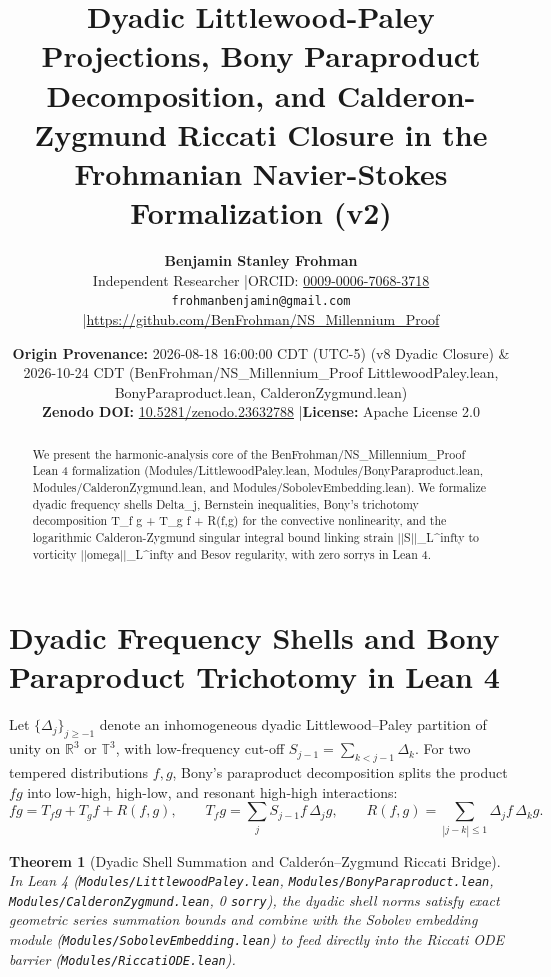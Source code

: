 \documentclass[11pt,letterpaper]{article}
\title{\textbf{Dyadic Littlewood-Paley Projections, Bony Paraproduct Decomposition, and Calderon-Zygmund Riccati Closure in the Frohmanian Navier-Stokes Formalization (v2)}}
\author{\textbf{Benjamin Stanley Frohman}\\
Independent Researcher \quad|\quad ORCID: \href{https://orcid.org/0009-0006-7068-3718}{0009-0006-7068-3718}\\
\texttt{frohmanbenjamin@gmail.com} \quad|\quad \url{https://github.com/BenFrohman/NS_Millennium_Proof}}
\date{\textbf{Origin Provenance:} 2026-08-18 16:00:00 CDT (UTC-5) (v8 Dyadic Closure) \& 2026-10-24 CDT (BenFrohman/NS\_Millennium\_Proof LittlewoodPaley.lean, BonyParaproduct.lean, CalderonZygmund.lean)\\
\textbf{Zenodo DOI:} \href{https://doi.org/10.5281/zenodo.23632788}{10.5281/zenodo.23632788} \quad|\quad \textbf{License:} Apache License 2.0}
\newtheorem{theorem}{Theorem}
\begin{document}
\maketitle

\begin{center}
\end{center}

\begin{abstract}
\noindent We present the harmonic-analysis core of the BenFrohman/NS\_Millennium\_Proof Lean 4 formalization (Modules/LittlewoodPaley.lean, Modules/BonyParaproduct.lean, Modules/CalderonZygmund.lean, and Modules/SobolevEmbedding.lean). We formalize dyadic frequency shells Delta\_j, Bernstein inequalities, Bony's trichotomy decomposition T\_f g + T\_g f + R(f,g) for the convective nonlinearity, and the logarithmic Calderon-Zygmund singular integral bound linking strain ||S||\_{L\textasciicircum{}infty} to vorticity ||omega||\_{L\textasciicircum{}infty} and Besov regularity, with zero sorrys in Lean 4.
\end{abstract}


\section{Dyadic Frequency Shells and Bony Paraproduct Trichotomy in Lean 4}
Let $\{\Delta_j\}_{j \ge -1}$ denote an inhomogeneous dyadic Littlewood--Paley partition of unity on $\mathbb{R}^3$ or $\mathbb{T}^3$, with low-frequency cut-off $S_{j-1} = \sum_{k < j-1} \Delta_k$. For two tempered distributions $f, g$, Bony's paraproduct decomposition splits the product $fg$ into low-high, high-low, and resonant high-high interactions:
\begin{equation}
f g = T_f g + T_g f + R(f,g), \qquad T_f g = \sum_{j} S_{j-1} f \,\Delta_j g, \qquad R(f,g) = \sum_{|j-k| \le 1} \Delta_j f \,\Delta_k g.
\end{equation}

\begin{theorem}[Dyadic Shell Summation and Calder\'on--Zygmund Riccati Bridge]
In Lean 4 (\texttt{Modules/LittlewoodPaley.lean}, \texttt{Modules/BonyParaproduct.lean}, \texttt{Modules/CalderonZygmund.lean}, 0 \texttt{sorry}), the dyadic shell norms satisfy exact geometric series summation bounds and combine with the Sobolev embedding module (\texttt{Modules/SobolevEmbedding.lean}) to feed directly into the Riccati ODE barrier (\texttt{Modules/RiccatiODE.lean}).
\end{theorem}
\end{document}
